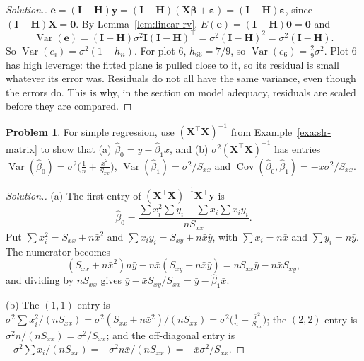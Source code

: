 \documentclass[11pt,a4paper]{article}
\numberwithin{equation}{section}
\theoremstyle{definition}
\newtheorem{problemx}{Problem}[subsection]
\newenvironment{problem}{\begin{problemx}}{\end{problemx}}
\newenvironment{solution}
  {\renewcommand{\qedsymbol}{}\begin{proof}[\textit{Solution}.]}
  {\end{proof}}
\begin{document}
\begin{solution}
$\mathbf{e} = (\mathbf{I} - \mathbf{H})\mathbf{y} = (\mathbf{I} - \mathbf{H})(\mathbf{X}\boldsymbol\beta + \boldsymbol\varepsilon) = (\mathbf{I} - \mathbf{H})\boldsymbol\varepsilon$,
since $(\mathbf{I} - \mathbf{H})\mathbf{X} = \mathbf{0}$. By Lemma~\ref{lem:linear-rv},
$E(\mathbf{e}) = (\mathbf{I} - \mathbf{H})\mathbf{0} = \mathbf{0}$ and
\[
\operatorname{Var}(\mathbf{e}) = (\mathbf{I} - \mathbf{H})\sigma^2\mathbf{I}(\mathbf{I} - \mathbf{H})^\top = \sigma^2(\mathbf{I} - \mathbf{H})^2 = \sigma^2(\mathbf{I} - \mathbf{H}) .
\]
So $\operatorname{Var}(e_i) = \sigma^2(1 - h_{ii})$. For plot 6, $h_{66} = 7/9$, so
$\operatorname{Var}(e_6) = \frac29\sigma^2$. Plot 6 has high leverage: the fitted plane is
pulled close to it, so its residual is small whatever its error was. Residuals do not all have
the same variance, even though the errors do. This is why, in the section on model adequacy,
residuals are scaled before they are compared.
\end{solution}

\begin{problem}\label{prob:slr-matrix}
For simple regression, use $(\mathbf{X}^\top\mathbf{X})^{-1}$ from
Example~\ref{exa:slr-matrix} to show that
(a) $\hat\beta_0 = \bar y - \hat\beta_1\bar x$, and
(b) $\sigma^2(\mathbf{X}^\top\mathbf{X})^{-1}$ has entries
$\operatorname{Var}(\hat\beta_0) = \sigma^2\bigl(\frac1n + \frac{\bar x^2}{S_{xx}}\bigr)$,
$\operatorname{Var}(\hat\beta_1) = \sigma^2/S_{xx}$ and
$\operatorname{Cov}(\hat\beta_0,\hat\beta_1) = -\bar x\sigma^2/S_{xx}$.
\end{problem}

\begin{solution}
(a) The first entry of $(\mathbf{X}^\top\mathbf{X})^{-1}\mathbf{X}^\top\mathbf{y}$ is
\[
\hat\beta_0 = \frac{\sum x_i^2 \sum y_i - \sum x_i \sum x_i y_i}{nS_{xx}} .
\]
Put $\sum x_i^2 = S_{xx} + n\bar x^2$ and $\sum x_i y_i = S_{xy} + n\bar x\bar y$, with
$\sum x_i = n\bar x$ and $\sum y_i = n\bar y$. The numerator becomes
\[
(S_{xx} + n\bar x^2)n\bar y - n\bar x(S_{xy} + n\bar x\bar y) = nS_{xx}\bar y - n\bar x S_{xy},
\]
and dividing by $nS_{xx}$ gives $\bar y - \bar x S_{xy}/S_{xx} = \bar y - \hat\beta_1\bar x$.

(b) The $(1,1)$ entry is $\sigma^2\sum x_i^2/(nS_{xx}) = \sigma^2(S_{xx} + n\bar x^2)/(nS_{xx}) = \sigma^2\bigl(\frac1n + \frac{\bar x^2}{S_{xx}}\bigr)$;
the $(2,2)$ entry is $\sigma^2 n/(nS_{xx}) = \sigma^2/S_{xx}$; and the off-diagonal entry is
$-\sigma^2\sum x_i/(nS_{xx}) = -\sigma^2 n\bar x/(nS_{xx}) = -\bar x\sigma^2/S_{xx}$.
\end{solution}
\end{document}
